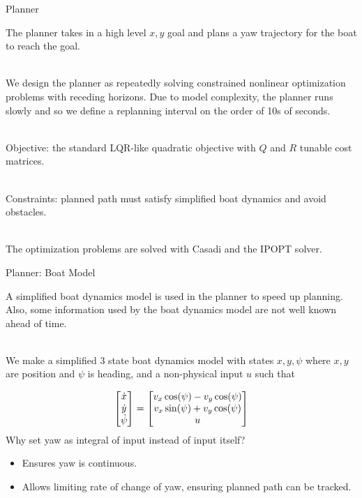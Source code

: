 \documentclass[10pt,xcolor={table,dvipsnames},t]{beamer}
\begin{document}
\begin{frame}{Planner}
    
    The planner takes in a high level \(x, y\) goal and plans a yaw trajectory for the boat 
    to reach the goal.
    
    \hfill\\
    We design the planner as repeatedly solving constrained nonlinear optimization problems with receding horizons. Due to model complexity, the planner runs slowly and so we define a 
    replanning interval on the order of 10s of seconds.
    
    \hfill\\
    Objective: the standard LQR-like quadratic objective with \(Q\) and \(R\) tunable cost matrices.
    
    \hfill\\
    Constraints: planned path must satisfy simplified boat dynamics and avoid obstacles.
    
    \hfill\\
    The optimization problems are solved with Casadi and the IPOPT solver.
    
\end{frame}

\begin{frame}{Planner: Boat Model}

    A simplified boat dynamics model is used in the planner to speed up planning.
    Also, some information used by the boat dynamics model are not well known 
    ahead of time.
    
    \hfill\\
    We make a simplified 3 state boat dynamics model with states \(x, y, \psi\) where 
    \(x, y\) are position and \(\psi\) is heading, and a non-physical input \(u\) 
    such that 
    
    \begin{equation}
        \mqty[\dot{x} \\ \dot{y} \\ \dot{\psi}]
         = \mqty[v_x \cos(\psi) - v_y \cos(\psi) \\ 
         v_x \sin(\psi) + v_y\cos(\psi) \\ 
         u]
    \end{equation}
    Why set yaw as integral of input instead of input itself?
    \begin{itemize}
        \item Ensures yaw is continuous.
        \item Allows limiting rate of change of yaw, ensuring planned path can be tracked.
    \end{itemize}

\end{frame}
\end{document}
